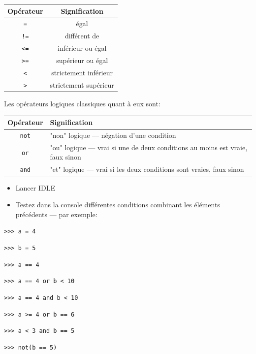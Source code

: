 \documentclass[12pt]{article}
\begin{document}
	\begin{tabular}{|c|c|}
		\hline
		\textbf{Opérateur} & \textbf{Signification} \\
		\hline
		\texttt{=} & égal \\
		\texttt{!=} & différent de \\
		\texttt{<=} & inférieur ou égal \\
		\texttt{>=} & supérieur ou égal\\
		\texttt{<} & strictement inférieur \\
		\texttt{>} & strictement supérieur \\
		\hline
	\end{tabular}
	
	Les opérateurs logiques classiques quant à eux sont:
\nopagebreak

	\begin{tabular}{|c|p{}|}
		\hline
		\textbf{Opérateur} & \textbf{Signification} \\
		\hline
		\texttt{not} & "non" logique --- négation d’une condition \\
		\hline
		\texttt{or} & "ou" logique --- vrai si une de deux conditions au moins est vraie, faux sinon\\
		\hline
		\texttt{and} & "et" logique --- vrai si les deux conditions sont vraies, faux sinon\\
		\hline
	\end{tabular}
	
	\begin{tcolorbox}[colframe=red!75!black, boxrule=2pt]
		\begin{minipage}{1\textwidth}
			\begin{itemize}				
				\item Lancer IDLE
				\item Testez dans la console différentes conditions combinant les éléments précédents --- par exemple:
			\end{itemize}
			{\footnotesize 
				\texttt{>>> a = 4}
				
				\texttt{>>> b = 5}
				
				\texttt{>>> a == 4}
				
				\texttt{>>> a == 4 or b < 10}
				
				\texttt{>>> a == 4 and b < 10}
				
				\texttt{>>> a >= 4 or b == 6}
				
				\texttt{>>> a < 3 and b == 5}
				
				\texttt{>>> not(b == 5)}
			}
		\end{minipage}
	\end{tcolorbox}
	
\end{document}
